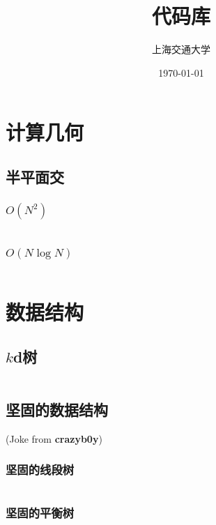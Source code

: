 \documentclass[a4paper]{article}
\title{代码库}
\author{上海交通大学}
\date{\today}
\newcommand{\cppcode}[1]{
    \inputminted[mathescape]{cpp}{source/#1}
}
\begin{document}
\maketitle

\tableofcontents

\clearpage

\section{计算几何}

\subsection{半平面交}

\subsubsection{$O(N^2)$}

\cppcode{half-plane-intersection-n2.cpp}

\subsubsection{$O(N \log N)$}

\cppcode{half-plane-intersection-nlogn.cpp}

\section{数据结构}

\subsection{$k$d树}

\cppcode{kd-tree.cpp}

\subsection{坚固的数据结构}

(Joke from \textbf{crazyb0y}) 

\subsubsection{坚固的线段树}

\cppcode{persistent-segment-tree.cpp}

\subsubsection{坚固的平衡树}
\end{document}
